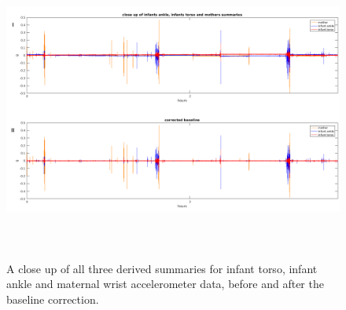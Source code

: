 \documentclass{article}
\begin{document}
{\begin{figure}[h]
\includegraphics[width=15cm, height=10cm]{exampleTorsoAnkle5.png}
\caption{A close up of all three derived summaries for infant torso, infant ankle and maternal wrist accelerometer data, before and after the baseline correction.}
\end{figure}
}
\end{document}
